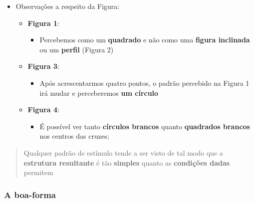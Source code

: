 \documentclass[
]{book}
\providecommand{\tightlist}{%
  \setlength{\itemsep}{0pt}\setlength{\parskip}{0pt}}
\begin{document}
\begin{itemize}
\tightlist
\item
  Observações a respeito da Figura:

  \begin{itemize}
  \tightlist
  \item
    \textbf{Figura 1}:

    \begin{itemize}
    \tightlist
    \item
      Percebemos como um \textbf{quadrado} e não como uma \textbf{figura inclinada} ou um \textbf{perfil} (Figura 2)
    \end{itemize}
  \item
    \textbf{Figura 3}:

    \begin{itemize}
    \tightlist
    \item
      Após acrescentarmos quatro pontos, o padrão percebido na Figura 1 irá mudar e perceberemos \textbf{um círculo}
    \end{itemize}
  \item
    \textbf{Figura 4}:

    \begin{itemize}
    \tightlist
    \item
      É possível ver tanto \textbf{círculos brancos} quanto \textbf{quadrados brancos} nos centros das cruzes;
    \end{itemize}
  \end{itemize}
\end{itemize}

\begin{quote}
Qualquer padrão de estímulo tende a ser visto de tal modo que a \textbf{estrutura resultante} é tão \textbf{simples} quanto as \textbf{condições dadas} permitem
\end{quote}

\hypertarget{a-boa-forma}{%
\subsubsection{A boa-forma}\label{a-boa-forma}}
\end{document}
